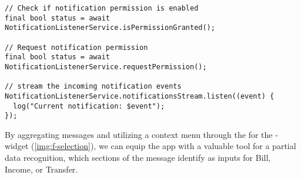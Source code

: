 \begin{lstlisting}
// Check if notification permission is enabled
final bool status = await NotificationListenerService.isPermissionGranted();

// Request notification permission
final bool status = await NotificationListenerService.requestPermission();

// stream the incoming notification events
NotificationListenerService.notificationsStream.listen((event) {
  log("Current notification: $event");
});
\end{lstlisting}

\noindent By aggregating messages and utilizing a context menu through the  for the 
-widget (\cref{img:f-selection}), we can equip the app with a valuable tool for a partial data 
recognition, which sections of the message identify as inputs for Bill, Income, or Transfer. 

